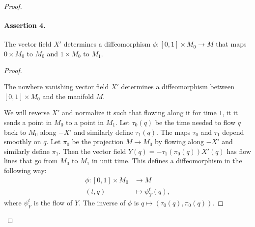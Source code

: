 \begin{proof}
\paragraph{Assertion 4.}
The vector field $X'$ determines a diffeomorphism $\phi: [0, 1] \times M_0 \to M$ that maps $0 \times M_0$ to $M_0$ and $1 \times M_0$ to $ M_1$.
\begin{proof}
    \begin{marginfigure}
        \centering
        \caption{The nowhere vanishing vector field $X'$ determines a diffeomorphism between  $[0,1] \times M_0$ and the manifold $M$.}
        \label{fig:assertion-4}
    \end{marginfigure}
    We will reverse $X'$ and normalize it such that flowing along it for time $1$, it it sends a point in  $M_0$ to a point in $M_1$.
    Let $\tau_0(q)$ be the time needed to flow $q$ back to $M_0$ along $-X'$ and similarly define $\tau_1(q)$. The maps $\tau_0$ and $\tau_1$ depend smoothly on $q$.
    Let $\pi_0$ be the projection  $M \to M_0$ by flowing along $-X'$ and similarly define $\pi_1$.
    Then the vector field $Y(q) = -\tau_1(\pi_0(q)) X'(q)$ has flow lines that go from $ M_0$ to $M_1$ in unit time.
    This defines a diffeomorphism in the following way:
    \begin{align*}
        \phi: [0, 1] \times M_0 &\longrightarrow M \\
        (t, q) &\longmapsto \psi^{t}_Y (q)
    ,\end{align*}
    where $\psi^{t}_Y$ is the flow of $Y$.
    The inverse of $\phi$ is $q \mapsto (\tau_0(q), \pi_0(q))$.
\end{proof}


\end{proof}
